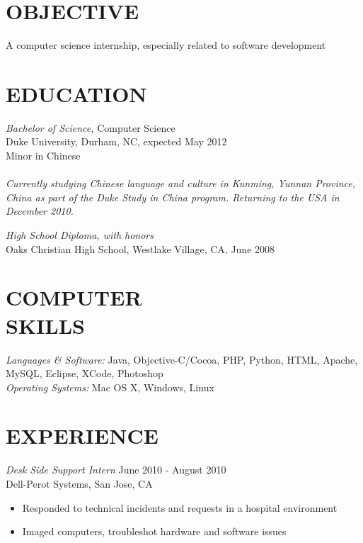 \documentclass[line,margin]{res}
\begin{document}
	\setlength{\pdfpageheight}{\paperheight}
	\setlength{\pdfpagewidth}{\paperwidth}
\address{Duke University, Box 94807, Durham, NC 27708}
\address{alex@galonsky.com \hspace{.93in} REDACTED}

 
\begin{resume}
 
\section{OBJECTIVE}       A computer science internship, especially related to software development
 
 
\section{EDUCATION} {\sl Bachelor of Science,} Computer Science \\
                Duke University, Durham, NC, 
                expected May 2012 \\
				Minor in Chinese \\ \\
				{\sl Currently studying Chinese language and culture in Kunming, Yunnan Province, China as part of the Duke Study in China program.  Returning to the USA in December 2010.}

				{\sl High School Diploma, with honors} \\
				Oaks Christian High School, Westlake Village, CA, June 2008
 
 
\section{COMPUTER \\ SKILLS} {\sl Languages \& Software:} Java, Objective-C/Cocoa, PHP, Python, HTML, Apache, MySQL, Eclipse, XCode, Photoshop \\
                {\sl Operating Systems:} Mac OS X, Windows, Linux
 
\section{EXPERIENCE} 
				
	{\sl Desk Side Support Intern} \hfill June 2010 - August 2010 \\
                Dell-Perot Systems, San Jose, CA
                 \begin{itemize}  \itemsep -2pt %
                 \item Responded to technical incidents and requests in a hospital environment
		 \item Imaged computers, troubleshot hardware and software issues
                \end{itemize}


\end{resume}
\end{document}
